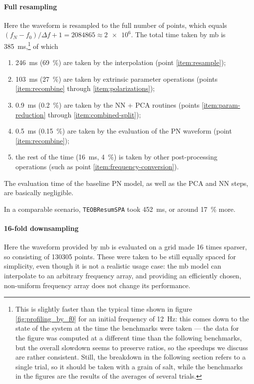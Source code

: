 \documentclass[main.tex]{subfiles}
\begin{document}
\paragraph{Full resampling}
Here the waveform is resampled to the full number of points, which equals \((f_N - f_0 ) / \Delta f + 1 = 2084865 \approx \num{2e6}\). 
The total time taken by \ac{mb} is \SI{385}{ms},\footnote{This is slightly faster than the typical time shown in figure \ref{fig:profiling_by_f0} for an initial frequency of \SI{12}{Hz}: this comes down to the state of the system at the time the benchmarks were taken --- the data for the figure was computed at a different time than the following benchmarks, but the overall slowdown seems to preserve ratios, so the speedups we discuss are rather consistent.
Still, the breakdown in the following section refers to a single trial, so it should be taken with a grain of salt, while the benchmarks in the figures are the results of the averages of several trials.} of which 
\begin{enumerate}
    \item \SI{246}{ms} (\SI{69}{\%}) are taken by the interpolation (point \ref{item:resample});
    \item \SI{103}{ms} (\SI{27}{\%}) are taken by extrinsic parameter operations (points \ref{item:recombine} through \ref{item:polarizations});
    \item \SI{0.9}{ms} (\SI{0.2}{\%}) are taken by the \ac{NN} + \ac{PCA} routines (points \ref{item:param-reduction} through \ref{item:combined-split});
    \item \SI{0.5}{ms} (\SI{0.15}{\%}) are taken by the evaluation of the \ac{PN} waveform (point \ref{item:recombine});
    \item the rest of the time (\SI{16}{ms}, \SI{4}{\%}) is taken by other post-processing operations (such as point \ref{item:frequency-conversion}).
\end{enumerate}

The evaluation time of the baseline \ac{PN} model, as well as the \ac{PCA} and \ac{NN} steps, are basically negligible. 

In a comparable scenario, \texttt{TEOBResumSPA} took \SI{452}{ms}, or around \SI{17}{\%} more. 

\paragraph{16-fold downsampling}

Here the waveform provided by \ac{mb} is evaluated on a grid made 16 times sparser, so consisting of 130305 points.
These were taken to be still equally spaced for simplicity, even though it is not a realistic usage case: the \ac{mb} model can interpolate to an arbitrary frequency array, and providing an efficiently chosen, non-uniform frequency array does not change its performance. 
\end{document}
